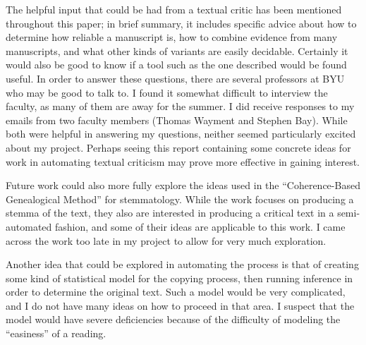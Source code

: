\documentclass[onecolumn, 12pt]{article}
\begin{document}
The helpful input that could be had from a textual critic has been mentioned
throughout this paper; in brief summary, it includes specific advice about how
to determine how reliable a manuscript is, how to combine evidence from many
manuscripts, and what other kinds of variants are easily decidable.  Certainly
it would also be good to know if a tool such as the one described would be
found useful.  In order to answer these questions, there are several professors
at BYU who may be good to talk to.  I found it somewhat difficult to interview
the faculty, as many of them are away for the summer.  I did receive responses
to my emails from two faculty members (Thomas Wayment and Stephen Bay).  While
both were helpful in answering my questions, neither seemed particularly
excited about my project.  Perhaps seeing this report containing some concrete
ideas for work in automating textual criticism may prove more effective in
gaining interest.

Future work could also more fully explore the ideas used in the
``Coherence-Based Genealogical Method'' for stemmatology.  While the work
focuses on producing a stemma of the text, they also are interested in
producing a critical text in a semi-automated fashion, and some of their ideas
are applicable to this work.  I came across the work too late in my project to
allow for very much exploration.

Another idea that could be explored in automating the process is that of
creating some kind of statistical model for the copying process, then running
inference in order to determine the original text.  Such a model would be very
complicated, and I do not have many ideas on how to proceed in that area.  I
suspect that the model would have severe deficiencies because of the difficulty
of modeling the ``easiness'' of a reading.



\end{document}
